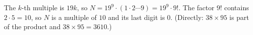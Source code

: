 The $k$-th multiple is $19k$, so $N=19^9\cdot(1\cdot2\cdots9)=19^9\cdot9!$. The factor $9!$ contains $2\cdot5=10$, so $N$ is a multiple of $10$ and its last digit is $\boxed{0}$. (Directly: $38\times95$ is part of the product and $38\times95=3610$.)
